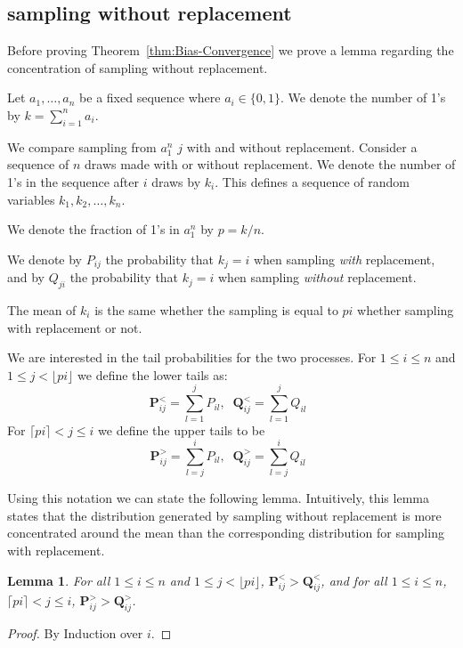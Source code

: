 \documentclass{article}
\newtheorem{lemma}[theorem]{Lemma}
\begin{document}
\subsection{sampling without replacement}
Before proving Theorem~\ref{thm:Bias-Convergence} we prove a 
lemma regarding the concentration of sampling without replacement.

Let $a_1,\ldots,a_n$ be a fixed sequence where $a_i \in
\{0,1\}$. We denote the number of 1's by $k=\sum_{i=1}^n a_i$.

We compare sampling from $a_1^n$ $j$ with and without replacement.
Consider a sequence of $n$ draws made with or without replacement.
We denote the number of 1's in the sequence after $i$ draws by
$k_i$. This defines a sequence of random variables $k_1,k_2,\ldots,k_n$.

We denote the fraction of 1's in $a_1^n$ by $p=k/n$.

We denote by $P_{ij}$ the probability that $k_j=i$ when sampling {\em
  with} replacement, and by $Q_{ji}$ the probability that $k_j=i$ when
sampling {\em without} replacement.

The mean of $k_i$ is the same whether the sampling is equal to $pi$
whether sampling with replacement or not.

\newcommand{\Pupper}{{\mathbf P}^{>}}
\newcommand{\Plower}{{\mathbf P}^{<}}
\newcommand{\Qupper}{{\mathbf Q}^{>}}
\newcommand{\Qlower}{{\mathbf Q}^{<}}


We are interested in the tail probabilities for the two processes. For
$1 \leq i \leq n$ and $1 \leq j < \lfloor pi \rfloor $ we define the lower tails as:
\[
\Plower_{ij} = \sum_{l=1}^j P_{il},\;\;
\Qlower_{ij} = \sum_{l=1}^j Q_{il}\;\;
\]
For $\lceil pi \rceil < j \leq i$ we define the upper tails to be
\[
\Pupper_{ij} = \sum_{l=j}^i P_{il},\;\;
\Qupper_{ij} = \sum_{l=j}^i Q_{il}\;\;
\]

Using this notation we can state the following lemma. Intuitively,
this lemma states that the distribution generated by sampling without
replacement is more concentrated around the mean than the
corresponding distribution for sampling with replacement.
\begin{lemma}
For all $1 \leq i \leq n$ and $1 \leq j < \lfloor pi \rfloor$,
$\Plower_{ij} > \Qlower_{ij}$, and for all $1 \leq i \leq n$, $\lceil
pi \rceil < j \leq i$, $\Pupper_{ij} > \Qupper_{ij}$.
\end{lemma}
\begin{proof}
  By Induction over $i$.
  \end{proof}
\end{document}
